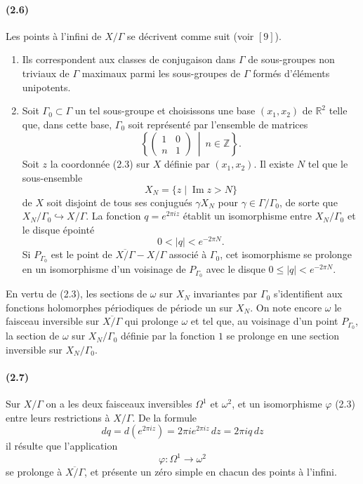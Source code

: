 \documentclass[10pt]{article}
\newcommand{\R}{\mathbb R}
\newcommand{\Z}{\mathbb Z}
\begin{document}
\paragraph{(2.6)}
Les points à l'infini de $X/\Gamma$ se décrivent comme suit (voir \([9]\)).

\begin{enumerate}[label=(\alph*)]
\item Ils correspondent aux classes de conjugaison dans $\Gamma$ de sous-groupes non
triviaux de $\Gamma$ maximaux parmi les sous-groupes de $\Gamma$ formés d'éléments
unipotents.

\item Soit $\Gamma_0\subset \Gamma$ un tel sous-groupe et choisissons une base
$(x_1,x_2)$ de $\R^2$ telle que, dans cette base, $\Gamma_0$ soit représenté par l'ensemble
de matrices
\[
\left\{\begin{pmatrix}1&0\\ n&1\end{pmatrix}\ \middle|\ n\in\Z\right\}.
\]
Soit $z$ la coordonnée (2.3) sur $X$ définie par $(x_1,x_2)$. Il existe $N$ tel que le
sous-ensemble
\[
X_N=\{z\mid \operatorname{Im}z>N\}
\]
de $X$ soit disjoint de tous ses conjugués $\gamma X_N$ pour $\gamma\in\Gamma/\Gamma_0$,
de sorte que $X_N/\Gamma_0\hookrightarrow X/\Gamma$. La fonction $q=e^{2\pi iz}$
établit un isomorphisme entre $X_N/\Gamma_0$ et le disque épointé
\[
0<|q|<e^{-2\pi N}.
\]
Si $P_{\Gamma_0}$ est le point de $\overline{X/\Gamma}-X/\Gamma$ associé à $\Gamma_0$,
cet isomorphisme se prolonge en un isomorphisme d'un voisinage de $P_{\Gamma_0}$ avec
le disque $0\le |q|<e^{-2\pi N}$.
\end{enumerate}

En vertu de (2.3), les sections de $\omega$ sur $X_N$ invariantes par $\Gamma_0$ s'identifient
aux fonctions holomorphes périodiques de période un sur $X_N$. On note encore $\omega$
le faisceau inversible sur $\overline{X/\Gamma}$ qui prolonge $\omega$ et tel que, au voisinage
d'un point $P_{\Gamma_0}$, la section de $\omega$ sur $X_N/\Gamma_0$ définie par la
fonction $1$ se prolonge en une section inversible sur $X_N/\Gamma_0$.

\paragraph{(2.7)}
Sur $X/\Gamma$ on a les deux faisceaux inversibles $\Omega^1$ et $\omega^2$, et un
isomorphisme $\varphi$ (2.3) entre leurs restrictions à $X/\Gamma$. De la formule
\[
dq=d(e^{2\pi iz})=2\pi i e^{2\pi iz}\,dz=2\pi iq\,dz
\]
il résulte que l'application
\[
\varphi:\Omega^1\to \omega^2
\]
se prolonge à $\overline{X/\Gamma}$, et présente un zéro simple en chacun des points à
l'infini.
\end{document}
